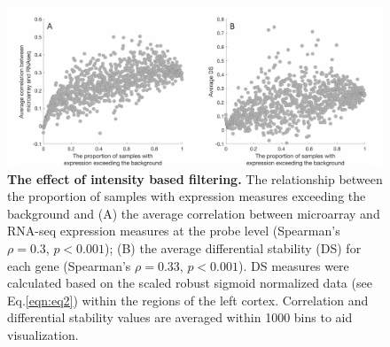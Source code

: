 \begin{figure}[h!]
  \centering
    \includegraphics[width=1\textwidth]{Chapter4/FigureS2.pdf}
\caption{\textbf{The effect of intensity based filtering.}
The relationship between the proportion of samples with expression measures exceeding the background and 
(A) the average correlation between microarray and RNA-seq expression measures at the probe level (Spearman's $\rho = 0.3$, $p<0.001$); 
(B) the average differential stability (DS) for each gene (Spearman's $\rho = 0.33$, $p<0.001$). DS measures were calculated based on the scaled robust sigmoid normalized data (see Eq.\ref{eqn:eq2}) within the regions of the left cortex. Correlation and differential stability values are averaged within 1000 bins to aid visualization.}
\label{fig:Ch4Sfig2}
\end{figure}


